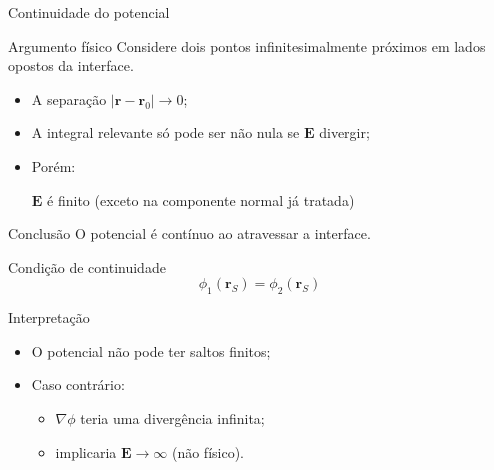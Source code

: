 \documentclass[aspectratio=169,11pt]{beamer}
\begin{document}

\begin{frame}{Continuidade do potencial}
\begin{block}{Argumento físico}
Considere dois pontos infinitesimalmente próximos em lados opostos da interface.
\end{block}

\pause

\begin{itemize}
\item A separação $|\mathbf{r} - \mathbf{r}_0| \to 0$;
\item A integral relevante só pode ser não nula se $\mathbf{E}$ divergir;
\item Porém:
\begin{center}
$\mathbf{E}$ é finito (exceto na componente normal já tratada)
\end{center}
\end{itemize}

\pause

\begin{alertblock}{Conclusão}
O potencial é contínuo ao atravessar a interface.
\end{alertblock}
\end{frame}


\begin{frame}{Condição de continuidade}
\begin{equation}
\phi_1(\mathbf{r}_S) = \phi_2(\mathbf{r}_S)
\tag{3.20}
\end{equation}

\pause

\begin{block}{Interpretação}
\begin{itemize}
\item O potencial não pode ter saltos finitos;
\item Caso contrário:
\begin{itemize}
\item $\nabla \phi$ teria uma divergência infinita;
\item implicaria $\mathbf{E} \to \infty$ (não físico).
\end{itemize}
\end{itemize}
\end{block}

\end{frame}
\end{document}
